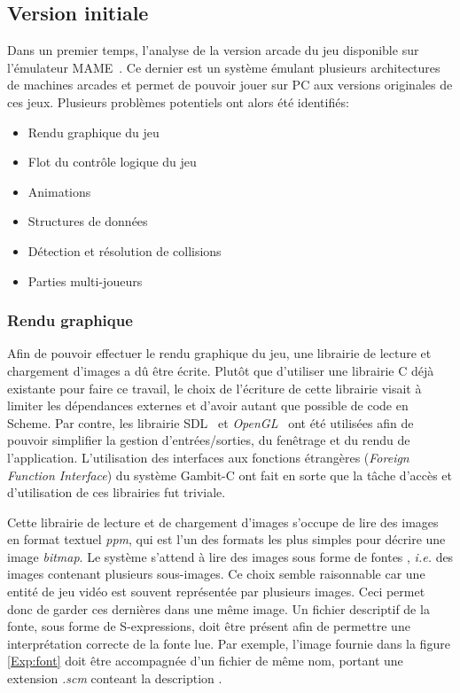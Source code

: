 \documentclass[12pt,oneside,letterpaper,francais]{book}
\newcommand{\ie}{{\textit{i.e. }}}
\newcommand{\scheme}[1]{\selectlanguage{english}{\tt #1}\selectlanguage{french}}
\begin{document}
\subsection{Version initiale}
\label{Exp:sp1}

Dans un premier temps, l'analyse de la version arcade du jeu
disponible sur l'émulateur MAME~\cite{MAME}. Ce dernier est un système
émulant plusieurs architectures de machines arcades et permet de
pouvoir jouer sur PC aux versions originales de ces jeux. Plusieurs
problèmes potentiels ont alors été identifiés:

\begin{itemize}
\item Rendu graphique du jeu
\item Flot du contrôle logique du jeu
\item Animations
\item Structures de données
\item Détection et résolution de collisions
\item Parties multi-joueurs
\end{itemize}

\subsubsection{Rendu graphique}

Afin de pouvoir effectuer le rendu graphique du jeu, une librairie de
lecture et chargement d'images a dû être écrite. Plutôt que d'utiliser
une librairie C déjà existante pour faire ce travail, le choix de
l'écriture de cette librairie visait à limiter les dépendances
externes et d'avoir autant que possible de code en Scheme. Par contre,
les librairie SDL~\cite{SDL} et \textit{OpenGL}~\cite{OpenGL} ont été
utilisées afin de pouvoir simplifier la gestion d'entrées/sorties, du
fenêtrage et du rendu de l'application. L'utilisation des interfaces
aux fonctions étrangères (\textit{Foreign Function Interface}) du
système Gambit-C ont fait en sorte que la tâche d'accès et
d'utilisation de ces librairies fut triviale.

Cette librairie de lecture et de chargement d'images s'occupe de lire
des images en format textuel \textit{ppm}, qui est l'un des formats
les plus simples pour décrire une image \textit{bitmap}. Le système
s'attend à lire des images sous forme de \og fontes \fg, \ie des
images contenant plusieurs sous-images. Ce choix semble raisonnable
car une entité de jeu vidéo est souvent représentée par plusieurs
images. Ceci permet donc de garder ces dernières dans une même
image. Un fichier descriptif de la fonte, sous forme de S-expressions,
doit être présent afin de permettre une interprétation correcte de la
fonte lue. Par exemple, l'image fournie dans la figure \ref{Exp:font}
doit être accompagnée d'un fichier de même nom, portant une extension
\emph{.scm} conteant la description \scheme{((colors: (white green
  red)) (chars: (0 1)))}.
\end{document}
